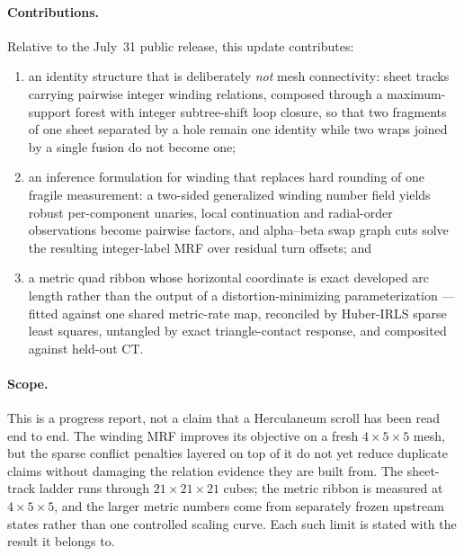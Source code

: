 \paragraph{Contributions.} Relative to the July~31 public release, this update contributes:
\begin{enumerate}
  \item an identity structure that is deliberately \emph{not} mesh connectivity: sheet tracks carrying pairwise integer winding relations, composed through a maximum-support forest with integer subtree-shift loop closure, so that two fragments of one sheet separated by a hole remain one identity while two wraps joined by a single fusion do not become one;
  \item an inference formulation for winding that replaces hard rounding of one fragile measurement: a two-sided generalized winding number field yields robust per-component unaries, local continuation and radial-order observations become pairwise factors, and alpha--beta swap graph cuts solve the resulting integer-label MRF over residual turn offsets; and
  \item a metric quad ribbon whose horizontal coordinate is exact developed arc length rather than the output of a distortion-minimizing parameterization --- fitted against one shared metric-rate map, reconciled by Huber-IRLS sparse least squares, untangled by exact triangle-contact response, and composited against held-out CT.
\end{enumerate}

\paragraph{Scope.} This is a progress report, not a claim that a Herculaneum scroll has been read end to end. The winding MRF improves its objective on a fresh $4\times5\times5$ mesh, but the sparse conflict penalties layered on top of it do not yet reduce duplicate claims without damaging the relation evidence they are built from. The sheet-track ladder runs through $21\times21\times21$ cubes; the metric ribbon is measured at $4\times5\times5$, and the larger metric numbers come from separately frozen upstream states rather than one controlled scaling curve. Each such limit is stated with the result it belongs to.

